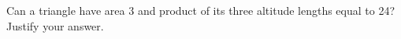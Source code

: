 Can a triangle have area 3 and product of its three altitude lengths equal to 24? Justify your answer.
